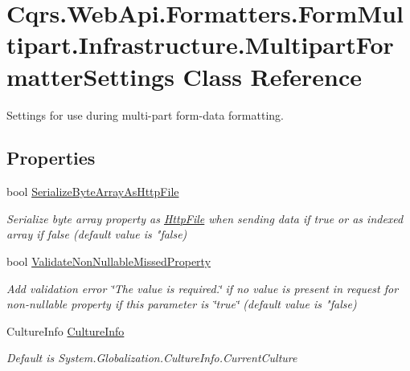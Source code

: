 \hypertarget{classCqrs_1_1WebApi_1_1Formatters_1_1FormMultipart_1_1Infrastructure_1_1MultipartFormatterSettings}{}\section{Cqrs.\+Web\+Api.\+Formatters.\+Form\+Multipart.\+Infrastructure.\+Multipart\+Formatter\+Settings Class Reference}
\label{classCqrs_1_1WebApi_1_1Formatters_1_1FormMultipart_1_1Infrastructure_1_1MultipartFormatterSettings}


Settings for use during multi-\/part form-\/data formatting.  


\subsection*{Properties}
\begin{DoxyCompactItemize}
\item 
bool \hyperlink{classCqrs_1_1WebApi_1_1Formatters_1_1FormMultipart_1_1Infrastructure_1_1MultipartFormatterSettings_ada06553a43f83734ecef9d811993d048_ada06553a43f83734ecef9d811993d048}{Serialize\+Byte\+Array\+As\+Http\+File}
\begin{DoxyCompactList}\small\item\em Serialize byte array property as \hyperlink{classCqrs_1_1WebApi_1_1Formatters_1_1FormMultipart_1_1Infrastructure_1_1HttpFile}{Http\+File} when sending data if true or as indexed array if false (default value is "false) \end{DoxyCompactList}\item 
bool \hyperlink{classCqrs_1_1WebApi_1_1Formatters_1_1FormMultipart_1_1Infrastructure_1_1MultipartFormatterSettings_a8db49349b200f3aea3fc9642ca1f9fd9_a8db49349b200f3aea3fc9642ca1f9fd9}{Validate\+Non\+Nullable\+Missed\+Property}
\begin{DoxyCompactList}\small\item\em Add validation error \char`\"{}\+The value is required.\char`\"{} if no value is present in request for non-\/nullable property if this parameter is \char`\"{}true\char`\"{} (default value is "false) \end{DoxyCompactList}\item 
Culture\+Info \hyperlink{classCqrs_1_1WebApi_1_1Formatters_1_1FormMultipart_1_1Infrastructure_1_1MultipartFormatterSettings_a3ee49282a37f9e6f39e5e0e8558e4e5e_a3ee49282a37f9e6f39e5e0e8558e4e5e}{Culture\+Info}
\begin{DoxyCompactList}\small\item\em Default is System.\+Globalization.\+Culture\+Info.\+Current\+Culture \end{DoxyCompactList}\end{DoxyCompactItemize}


